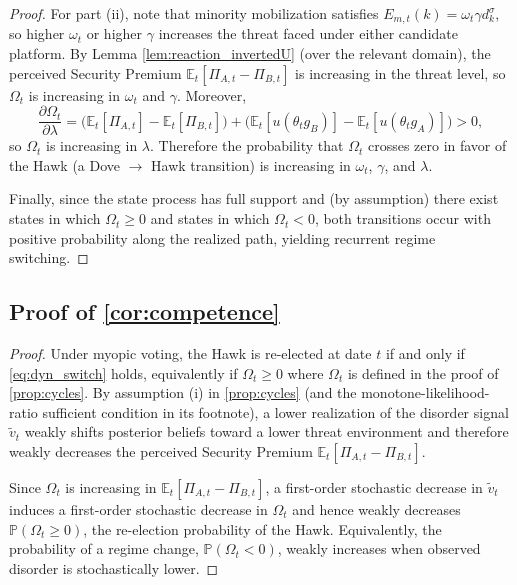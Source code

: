 \begin{proof}
For part (ii), note that minority mobilization satisfies $E_{m,t}(k)=\omega_t\gamma d_k^{\sigma}$, so higher $\omega_t$ or higher $\gamma$ increases the threat faced under either candidate platform. By Lemma \autoref{lem:reaction_invertedU} (over the relevant domain), the perceived Security Premium $\mathbb{E}_t[\Pi_{A,t}-\Pi_{B,t}]$ is increasing in the threat level, so $\Omega_t$ is increasing in $\omega_t$ and $\gamma$. Moreover,
\begin{equation}
\frac{\partial \Omega_t}{\partial \lambda} = \Big(\mathbb{E}_t[\Pi_{A,t}]-\mathbb{E}_t[\Pi_{B,t}]\Big)+\Big(\mathbb{E}_t[u(\theta_t g_B)]-\mathbb{E}_t[u(\theta_t g_A)]\Big) > 0,
\end{equation}
so $\Omega_t$ is increasing in $\lambda$. Therefore the probability that $\Omega_t$ crosses zero in favor of the Hawk (a Dove $\rightarrow$ Hawk transition) is increasing in $\omega_t$, $\gamma$, and $\lambda$.

Finally, since the state process has full support and (by assumption) there exist states in which $\Omega_t\ge 0$ and states in which $\Omega_t<0$, both transitions occur with positive probability along the realized path, yielding recurrent regime switching.
\end{proof}

\subsection*{Proof of \autoref{cor:competence}} \label{app:proof:competence}

\begin{proof}
Under myopic voting, the Hawk is re-elected at date $t$ if and only if \autoref{eq:dyn_switch} holds, equivalently if $\Omega_t\ge 0$ where $\Omega_t$ is defined in the proof of \autoref{prop:cycles}. By assumption (i) in \autoref{prop:cycles} (and the monotone-likelihood-ratio sufficient condition in its footnote), a lower realization of the disorder signal $\tilde{v}_t$ weakly shifts posterior beliefs toward a lower threat environment and therefore weakly decreases the perceived Security Premium $\mathbb{E}_t[\Pi_{A,t}-\Pi_{B,t}]$.

Since $\Omega_t$ is increasing in $\mathbb{E}_t[\Pi_{A,t}-\Pi_{B,t}]$, a first-order stochastic decrease in $\tilde{v}_t$ induces a first-order stochastic decrease in $\Omega_t$ and hence weakly decreases $\mathbb{P}(\Omega_t\ge 0)$, the re-election probability of the Hawk. Equivalently, the probability of a regime change, $\mathbb{P}(\Omega_t<0)$, weakly increases when observed disorder is stochastically lower.
\end{proof}

